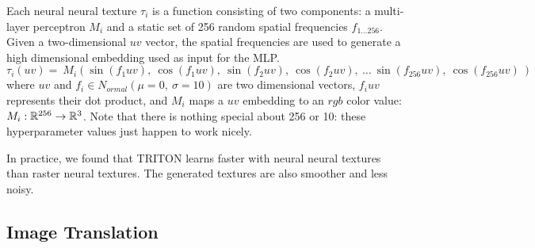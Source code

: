\documentclass{article}
\begin{document}
	Each neural neural texture $\tau_i$ is a function consisting of two components: a multi-layer perceptron $M_i$ and a static set of 256 random spatial frequencies $f_{1...256}$. 
	Given a two-dimensional $uv$ vector, the spatial frequencies are used to generate a high dimensional embedding used as input for the MLP.
	\begin{equation}
			\tau_i(uv) = 
			\
			M_i(
				\sin( f_1     uv  ) , \ 
				\cos( f_1     uv  ) , \ 
				\sin( f_2     uv  ) , \ 
				\cos( f_2     uv  ) , \ 
				\dots \ 
				\sin( f_{256} uv  ) , \ 
				\cos( f_{256} uv  )  \ 
			)
	\end{equation}
	where $uv$ and $f_i \in N_{ormal}(\mu=0,\ \sigma=10)$ are two dimensional vectors,
	 $f_i uv$ represents their dot product, 
	 and $M_i$ maps a $uv$ embedding to an $rgb$ color value:
	 $M_i: \mathbb{R}^{256} \rightarrow \mathbb{R}^3$.
	Note that there is nothing special about 256 or 10: these hyperparameter values just happen to work nicely.
	
	
	In practice, we found that TRITON learns faster with neural neural textures than raster neural textures. The generated textures are also smoother and less noisy. 





\subsection{Image Translation}
\label{sec:image_translation}
\end{document}

